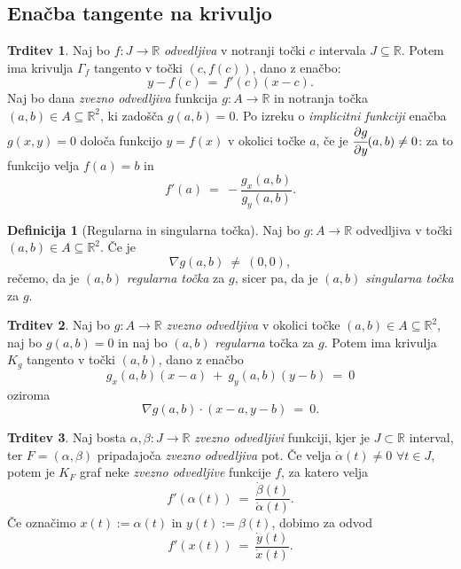 \documentclass[11pt]{article}
\newcommand{\R}{\mathbb{R}}
\theoremstyle{definition}
\newtheorem{definicija}{Definicija}[section]
\theoremstyle{definition}
\newtheorem{trditev}{Trditev}[section]
\theoremstyle{definition}
\theoremstyle{theorem}
\begin{document}

\subsection{Enačba tangente na krivuljo}
\vspace{0.5cm}

\begin{trditev}

Naj bo $f: J \rightarrow \R$ \textit{odvedljiva} v notranji točki $c$ intervala $J \subseteq \R$. Potem ima krivulja $\Gamma_f$ tangento v točki $(c, f(c))$, dano z enačbo:
$$y - f(c) ~=~ f'(c)(x-c).$$
Naj bo dana \textit{zvezno odvedljiva} funkcija $g: A \rightarrow \R$ in notranja točka $(a, b) \in A \subseteq \R^2$, ki zadošča $g(a, b) = 0.$ Po izreku o \textit{implicitni funkciji} enačba $g(x, y) = 0$ določa funkcijo $y = f(x)$ v okolici točke $a$, če je $\cfrac{\partial g}{\partial y}(a, b) \neq 0$: za to funkcijo velja $f(a) = b$ in 
$$f'(a) ~=~ -\frac{g_x(a,b)}{g_y(a, b)}.$$

\end{trditev}
\vspace{0.5cm}

\begin{definicija}[Regularna in singularna točka]

Naj bo $g: A \rightarrow \mathbb{R}$ odvedljiva v točki $(a, b) \in A \subseteq \mathbb{R}^2$. Če je 
$$\nabla g(a, b) ~\neq~ (0, 0),$$
rečemo, da je $(a, b)$ \textit{regularna točka} za $g$, sicer pa, da je $(a, b)$ \textit{singularna točka} za $g$. 

\end{definicija}
\vspace{0.5cm}

\begin{trditev}

Naj bo $g: A \rightarrow \R$ \textit{zvezno odvedljiva} v okolici točke $(a, b) \in A \subseteq \R^2$, naj bo $g(a, b) = 0$ in naj bo $(a, b)$ \textit{regularna} točka za $g$. Potem ima krivulja $K_g$ tangento v točki $(a, b)$, dano z enačbo
$$g_x(a, b)(x-a) ~+~ g_y(a, b)(y-b) ~=~ 0$$
oziroma
$$\nabla{g(a, b)} \cdot (x-a, y-b) ~=~ 0.$$

\end{trditev}
\vspace{0.5cm}

\begin{trditev}

Naj bosta $\alpha, \beta: J \rightarrow \R$ \textit{zvezno odvedljivi} funkciji, kjer je $J \subset \R$ interval, ter $F = (\alpha, \beta)$ pripadajoča \textit{zvezno odvedljiva} pot. Če velja $\dot{\alpha}(t) \neq 0$ $\forall t \in J$, potem je $K_F$ graf neke \textit{zvezno odvedljive} funkcije $f$, za katero velja
$$f'(\alpha(t)) ~=~ \frac{\dot{\beta}(t)}{\dot{\alpha}(t)}.$$
Če označimo $x(t) := \alpha(t)$ in $y(t) := \beta(t)$, dobimo za odvod
$$f'(x(t)) ~=~ \frac{\dot{y}(t)}{\dot{x}(t)}.$$

\end{trditev}
\vspace{0.5cm}
\end{document}
